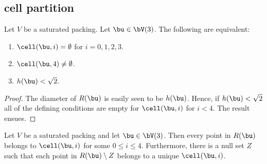\bigskip
\subsection{cell partition}

\begin{lemma}[]\label{lemma:M-complement4} 
Let $V$ be a saturated packing.  Let $\bu\in \bV(3)$.
The following  are equivalent:
\begin{enumerate} 
\item  $\cell(\bu,i)=\emptyset$ for $i=0,1,2,3$.
\item  $\cell(\bu,4)\ne\emptyset$.
\item  $h(\bu)<\sqrt2$.
\end{enumerate}
\end{lemma}

\begin{proof} 
  The diameter of $R(\bu)$ is easily seen to be $h(\bu)$.  Hence, if
  $h(\bu)<\sqrt2$ all of the defining conditions are empty for
  $\cell(\bu,i)$ for $i<4$.  The result ensues.
\end{proof}

\begin{lemma}[]\label{lemma:M-exhaust} 
  Let $V$ be a saturated packing and let $\bu\in \bV(3)$. Then
  every point in $R(\bu)$ belongs to $\cell(\bu,i)$ for some $0\le
  i\le 4$.  Furthermore, there is a null set $Z$ such that each point
  in $R(\bu)\setminus Z$ belongs to a unique $\cell(\bu,i)$.
\end{lemma}

